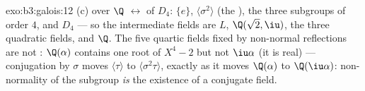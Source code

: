 \begin{solution}{exo:b3:galois:12}
(c)  over $\Q$ $\leftrightarrow$  of
$D_4$: $\{e\}$, $\langle\sigma^2\rangle$ (the ), the
three subgroups of order $4$, and $D_4$ --- so the 
intermediate fields are $L$, $\Q(\sqrt2, \iu)$, the three
quadratic fields, and $\Q$. The five quartic fields fixed by
non-normal reflections are not : $\Q(\alpha)$ contains
one root of $X^4 - 2$ but not $\iu\alpha$ (it is real) ---
conjugation by $\sigma$ moves $\langle\tau\rangle$ to
$\langle\sigma^2\tau\rangle$, exactly as it moves
$\Q(\alpha)$ to $\Q(\iu\alpha)$: non-normality of the
subgroup \emph{is} the existence of a conjugate field.
\end{solution}

